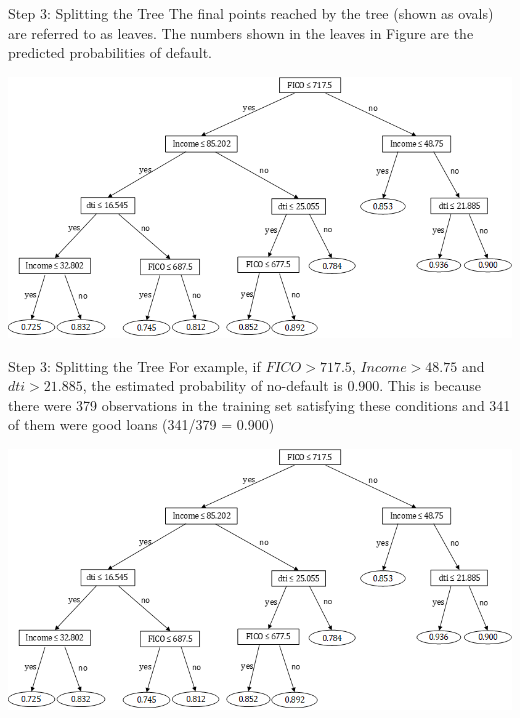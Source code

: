 \documentclass[11pt]{beamer}
\begin{document}
\begin{frame}{Step 3: Splitting the Tree}
The final points reached by the tree (shown as ovals) are referred to as
leaves. The numbers shown in the leaves in Figure are the predicted
probabilities of default.	
\begin{center}
	\includegraphics[scale=.5]{../05-pictures/lesson-3-3_pic_7.png}
	\end{center}
\end{frame}
%
%
\begin{frame}{Step 3: Splitting the Tree}
\footnotesize{
 For example, if $FICO > 717.5$, $Income > 48.75$ and $dti > 21.885$, the estimated probability of no-default is 0.900. This is because there were 379 observations in the training set satisfying these
conditions and 341 of them were good loans (341/379 = 0.900)}	
\begin{center}
	\includegraphics[scale=.5]{../05-pictures/lesson-3-3_pic_7.png}
	\end{center}
\end{frame}
%
%
\end{document}
